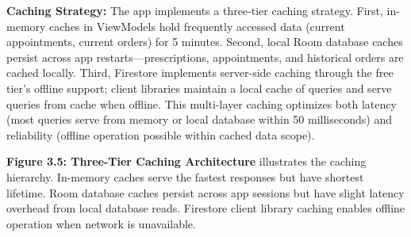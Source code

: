 \documentclass[12pt,a4paper]{report}
\begin{document}
\textbf{Caching Strategy:} The app implements a three-tier caching strategy. First, in-memory caches in ViewModels hold frequently accessed data (current appointments, current orders) for 5 minutes. Second, local Room database caches persist across app restarts—prescriptions, appointments, and historical orders are cached locally. Third, Firestore implements server-side caching through the free tier's offline support; client libraries maintain a local cache of queries and serve queries from cache when offline. This multi-layer caching optimizes both latency (most queries serve from memory or local database within 50 milliseconds) and reliability (offline operation possible within cached data scope).

\textbf{Figure 3.5: Three-Tier Caching Architecture} illustrates the caching hierarchy. In-memory caches serve the fastest responses but have shortest lifetime. Room database caches persist across app sessions but have slight latency overhead from local database reads. Firestore client library caching enables offline operation when network is unavailable.
\end{document}
